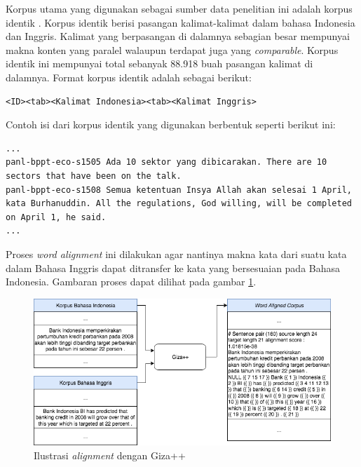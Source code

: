 Korpus utama yang digunakan sebagai sumber data penelitian ini adalah korpus identik \citep{larasati2012identic}. Korpus identik berisi pasangan kalimat-kalimat dalam bahasa Indonesia dan Inggris. Kalimat yang berpasangan di dalamnya sebagian besar mempunyai makna konten yang paralel walaupun terdapat juga yang \textit{comparable}. Korpus identik ini mempunyai total sebanyak 88.918 buah pasangan kalimat di dalamnya. Format korpus identik adalah sebagai berikut:
\begin{lstlisting}
<ID><tab><Kalimat Indonesia><tab><Kalimat Inggris>
\end{lstlisting}
\clearpage
Contoh isi dari korpus identik yang digunakan berbentuk seperti berikut ini:
\begin{lstlisting}[backgroundcolor = \color{white}]
...
panl-bppt-eco-s1505	Ada 10 sektor yang dibicarakan.	There are 10 sectors that have been on the talk.
panl-bppt-eco-s1508	Semua ketentuan Insya Allah akan selesai 1 April, kata Burhanuddin.	All the regulations, God willing, will be completed on April 1, he said.
...
\end{lstlisting}


Proses \textit{word alignment} ini dilakukan agar nantinya makna kata dari suatu kata dalam Bahasa Inggris dapat ditransfer ke kata yang bersesuaian pada Bahasa Indonesia. Gambaran proses dapat dilihat pada gambar \ref{fig:giza-aligning}.

\begin{figure}
	\centering
	\includegraphics[width=1\linewidth]{adit_pics/giza-process.png}
	\caption{Ilustrasi \textit{alignment} dengan Giza++}
	\label{fig:giza-aligning}
\end{figure}

